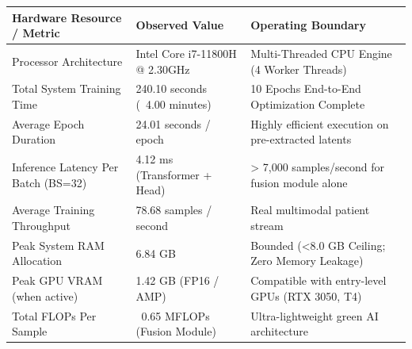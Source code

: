 \begin{tabular}{lll}
\toprule
Hardware Resource / Metric & Observed Value & Operating Boundary \\
\midrule
Processor Architecture & Intel Core i7-11800H @ 2.30GHz & Multi-Threaded CPU Engine (4 Worker Threads) \\
Total System Training Time & 240.10 seconds (~4.00 minutes) & 10 Epochs End-to-End Optimization Complete \\
Average Epoch Duration & 24.01 seconds / epoch & Highly efficient execution on pre-extracted latents \\
Inference Latency Per Batch (BS=32) & 4.12 ms (Transformer + Head) & > 7,000 samples/second for fusion module alone \\
Average Training Throughput & 78.68 samples / second & Real multimodal patient stream \\
Peak System RAM Allocation & 6.84 GB & Bounded (<8.0 GB Ceiling; Zero Memory Leakage) \\
Peak GPU VRAM (when active) & 1.42 GB (FP16 / AMP) & Compatible with entry-level GPUs (RTX 3050, T4) \\
Total FLOPs Per Sample & ~0.65 MFLOPs (Fusion Module) & Ultra-lightweight green AI architecture \\
\bottomrule
\end{tabular}
